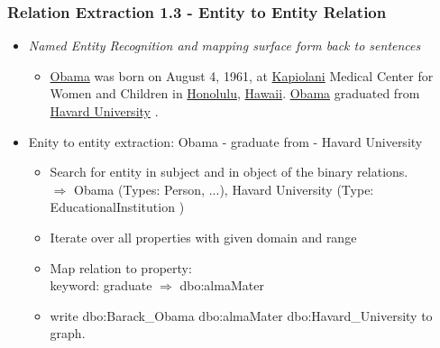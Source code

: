 \documentclass{beamer}
\begin{document}
\begin{frame}
\frametitle{Relation Extraction 1.3 - Entity to Entity Relation}
\begin{example}
	\begin{itemize}
		\item \textit{Named Entity Recognition and mapping surface form back to sentences} \\
		\begin{itemize} \item \underline{Obama} was born on August 4, 1961, at \underline{Kapiolani} Medical Center for Women and Children in \underline{Honolulu}, \underline{Hawaii}. \underline{Obama} graduated from \underline{Havard University} .
		\end{itemize}
		\item Enity to entity extraction: Obama - graduate from - Havard University \begin{itemize} \item Search for entity in subject and in object of the binary relations. \\ $\Rightarrow$ Obama (Types: Person, ...), Havard University (Type: EducationalInstitution )
			\item Iterate over all properties with given domain and range
			\item Map relation to property: \\ keyword: graduate $\Rightarrow$ dbo:almaMater
			\item write dbo:Barack\_Obama dbo:almaMater dbo:Havard\_University to graph.
		\end{itemize}		 

	\end{itemize}
\end{example}
\end{frame}
\end{document}
